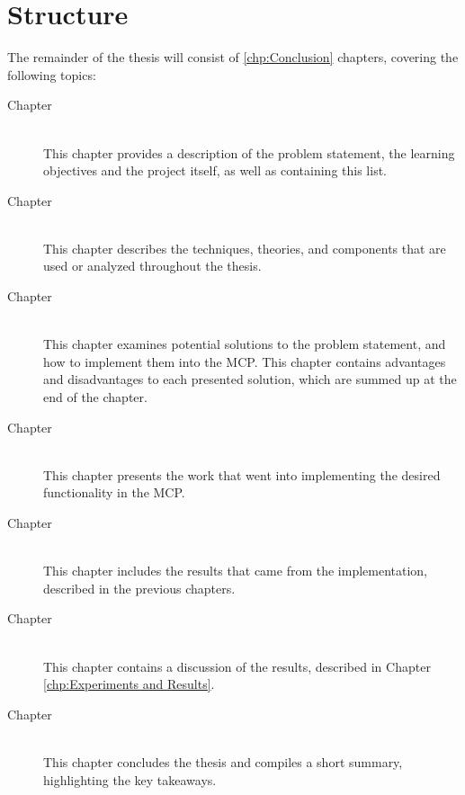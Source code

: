 \section{Structure}
The remainder of the thesis will consist of \ref{chp:Conclusion} chapters, covering the following topics:
\begin{description}
	\item[Chapter ]\ \\
	This chapter provides a description of the problem statement, the learning objectives and the project itself, as well as containing this list.
	\item[Chapter ]\ \\
	This chapter describes the techniques, theories, and components that are used or analyzed throughout the thesis.
	\item[Chapter ]\ \\
	This chapter examines potential solutions to the problem statement, and how to implement them into the MCP. This chapter contains advantages and disadvantages to each presented solution, which are summed up at the end of the chapter.
	\item[Chapter ]\ \\
	This chapter presents the work that went into implementing the desired functionality in the MCP.
	\item[Chapter ]\ \\
	This chapter includes the results that came from the implementation, described in the previous chapters.
	\item[Chapter ]\ \\
	This chapter contains a discussion of the results, described in Chapter \ref{chp:Experiments and Results}.
	\item[Chapter ]\ \\
	This chapter concludes the thesis and compiles a short summary, highlighting the key takeaways.
\end{description}